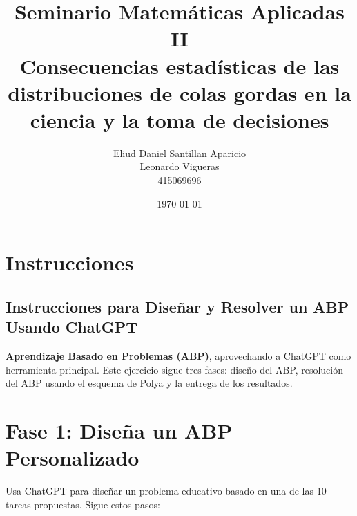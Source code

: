 \documentclass[a4paper,12pt]{article}
\title{\textbf{Seminario Matemáticas Aplicadas II\\Consecuencias estadísticas de las distribuciones de colas gordas en la ciencia y la toma de decisiones}}
\author{Eliud Daniel Santillan Aparicio \\ Leonardo Vigueras \\ 415069696}
\date{\today}
\begin{document}
\maketitle
\section*{Instrucciones}

\subsection*{Instrucciones para Diseñar y Resolver un ABP Usando ChatGPT}

\textbf{Aprendizaje Basado en Problemas (ABP)}, aprovechando a ChatGPT como herramienta principal. Este ejercicio sigue tres fases: diseño del ABP, resolución del ABP usando el esquema de Polya y la entrega de los resultados.

\section{Fase 1: Diseña un ABP Personalizado}

Usa ChatGPT para diseñar un problema educativo basado en una de las 10 tareas propuestas. Sigue estos pasos:
\end{document}
